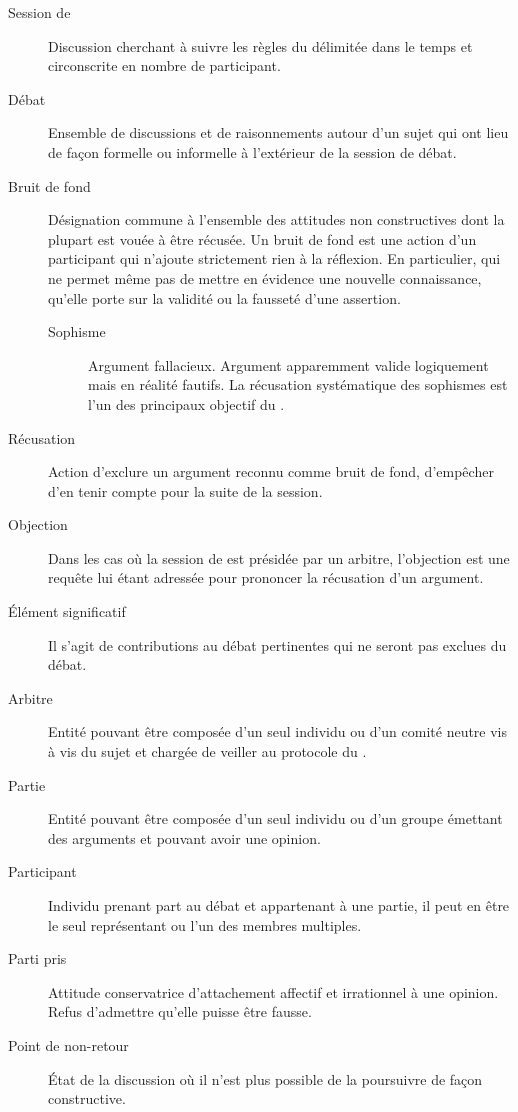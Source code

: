 \begin{description}
  \item[Session de \mainabbr{}] Discussion cherchant à suivre les règles du \mainabbr{} délimitée dans le temps et circonscrite en nombre de participant.
  \item[Débat] Ensemble de discussions et de raisonnements autour d’un sujet qui ont lieu de façon formelle ou informelle à l’extérieur de la session de débat.
  \item[Bruit de fond] Désignation commune à l’ensemble des attitudes non constructives dont la plupart est vouée à être récusée. Un bruit de fond est une action d’un participant qui n’ajoute strictement rien à la réflexion. En particulier, qui ne permet même pas de mettre en évidence une nouvelle connaissance, qu’elle porte sur la validité ou la fausseté d’une assertion.

    \begin{description}
      \item[Sophisme] Argument fallacieux. Argument apparemment valide logiquement mais en réalité fautifs. La récusation systématique des sophismes est l’un des principaux objectif du \mainabbr{}.
    \end{description}

  \item[Récusation] Action d’exclure un argument reconnu comme bruit de fond, d’empêcher d’en tenir compte pour la suite de la session.
  \item[Objection] Dans les cas où la session de \mainabbr{} est présidée par un arbitre, l’objection est une requête lui étant adressée pour prononcer la récusation d’un argument.
  \item[Élément significatif] Il s’agit de contributions au débat pertinentes  qui ne seront pas exclues du débat.
  \item[Arbitre] Entité pouvant être composée d’un seul individu ou d’un comité neutre vis à vis du sujet et chargée de veiller au protocole du \mainabbr{}.
  \item[Partie] Entité pouvant être composée d’un seul individu ou d’un groupe émettant des arguments et pouvant avoir une opinion.
  \item[Participant] Individu prenant part au débat et appartenant à une partie, il peut en être le seul représentant ou l’un des membres multiples.
  \item[Parti pris] Attitude conservatrice d’attachement affectif et irrationnel à une opinion. Refus d’admettre qu’elle puisse être fausse.
  \item[Point de non-retour] État de la discussion où il n’est plus possible de la poursuivre de façon constructive.
\end{description}

